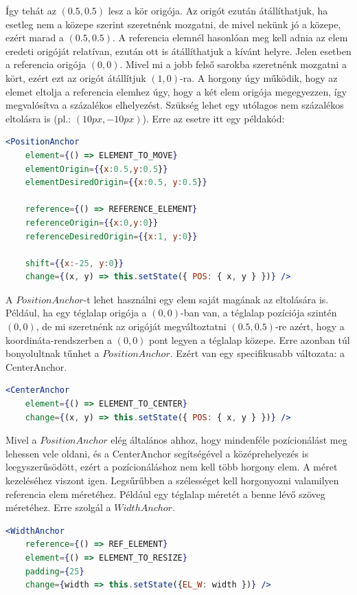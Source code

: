 \documentclass[a4paper,12pt,oneside]{report}
\begin{document}
\begin{justify}
	Így tehát az $ (0.5,0.5) $ lesz a kör origója. Az origót ezután átállíthatjuk, ha esetleg nem a közepe szerint szeretnénk mozgatni, de mivel nekünk jó a közepe, ezért marad a $ (0.5,0.5) $. A referencia elemnél hasonlóan meg kell adnia az elem eredeti origóját relatívan, ezután ott is átállíthatjuk a kívánt helyre. Jelen esetben a referencia origója $ (0,0) $. Mivel mi a jobb felső sarokba szeretnénk mozgatni a kört, ezért ezt az origót átállítjuk $(1,0)$-ra. A horgony úgy működik, hogy az elemet eltolja a referencia elemhez úgy, hogy a két elem origója megegyezzen, így megvalósítva a százalékos elhelyezést. Szükség lehet egy utólagos nem százalékos eltolásra is (pl.: $(10px,-10px)$). Erre az esetre itt egy példakód:

	\begin{lstlisting}[language=jsx]
	<PositionAnchor 
	element={() => ELEMENT_TO_MOVE}
	elementOrigin={{x:0.5,y:0.5}}
	elementDesiredOrigin={{x:0.5, y:0.5}}

	reference={() => REFERENCE_ELEMENT}
	referenceOrigin={{x:0,y:0}}
	referenceDesiredOrigin={{x:1, y:0}}

	shift={{x:-25, y:0}}
	change={(x, y) => this.setState({ POS: { x, y } })} />
	\end{lstlisting}

	A $PositionAnchor$-t lehet használni egy elem saját magának az eltolására is. Például, ha egy téglalap origója a $(0,0)$-ban van, a téglalap pozíciója szintén $(0,0)$, de mi szeretnénk az origóját megváltoztatni $(0.5,0.5)$-re azért, hogy a koordináta-rendszerben a $(0,0)$ pont legyen a téglalap közepe. Erre azonban túl bonyolultnak tűnhet a $PositionAnchor$. Ezért van egy specifikusabb változata: a CenterAnchor.

	\begin{lstlisting}[language=jsx]
	<CenterAnchor
	element={() => ELEMENT_TO_CENTER}
	change={(x, y) => this.setState({ POS: { x, y } })} />
	\end{lstlisting}

	Mivel a $PositionAnchor$ elég általános ahhoz, hogy mindenféle pozícionálást meg lehessen vele oldani, és a CenterAnchor segítségével a középrehelyezés is leegyszerűsödött, ezért a pozícionáláshoz nem kell több horgony elem. A méret kezeléséhez viszont igen. Legsűrűbben a szélességet kell horgonyozni valamilyen referencia elem méretéhez. Például egy téglalap méretét a benne lévő szöveg méretéhez. Erre szolgál a $WidthAnchor$.

	\begin{lstlisting}[language=jsx]
	<WidthAnchor
	reference={() => REF_ELEMENT}
	element={() => ELEMENT_TO_RESIZE}
	padding={25}
	change={width => this.setState({EL_W: width })} />
	\end{lstlisting}


\end{justify}
\end{document}
